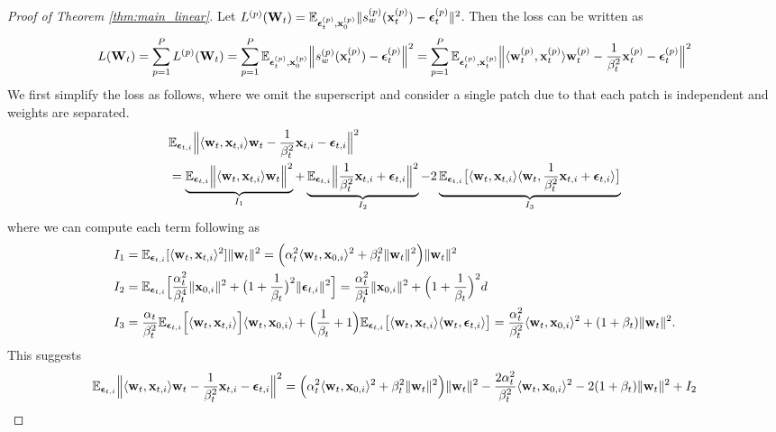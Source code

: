 \begin{proof}[Proof of Theorem \ref{thm:main_linear}]
Let $L^{(p)} ({\mathbf{W}}_t) = {\mathbb{E}}_{{\boldsymbol{\epsilon}}_{t}^{(p)}, {\mathbf{x}}_{0}^{(p)}} \|  s_w^{(p)}({\mathbf{x}}_t^{(p)}) - {\boldsymbol{\epsilon}}_{t}^{(p)} \|^2$. Then the loss can be written as
\begin{align*}
    L({\mathbf{W}}_t) = \sum_{p=1}^P L^{(p)} ({\mathbf{W}}_t) =  \sum_{p=1}^P {\mathbb{E}}_{{\boldsymbol{\epsilon}}_{t}^{(p)}, {\mathbf{x}}_{0}^{(p)}} \Big\|  s_w^{(p)}({\mathbf{x}}_t^{(p)}) - {\boldsymbol{\epsilon}}_{t}^{(p)} \Big\|^2 = \sum_{p=1}^P  {\mathbb{E}}_{{\boldsymbol{\epsilon}}_{t}^{(p)}, {\mathbf{x}}_t^{(p)}}  \Big\|  \langle {\mathbf w}_t^{(p)}, {\mathbf{x}}_{t}^{(p)} \rangle   {\mathbf w}_t^{(p)} - \frac{1}{\beta_t^2} {\mathbf{x}}_{t}^{(p)} - {\boldsymbol{\epsilon}}_{t}^{(p)} \Big\|^2
\end{align*}
We first simplify the loss as follows, where we omit the superscript and consider a single patch due to that each patch is independent and weights are separated.
\begin{align*}
    &{\mathbb{E}}_{{\boldsymbol{\epsilon}}_{t,i}} \Big\| \langle {\mathbf w}_t, {\mathbf{x}}_{t,i} \rangle {\mathbf w}_t - \frac{1}{\beta_t^2} {\mathbf{x}}_{t,i} - {\boldsymbol{\epsilon}}_{t,i}  \Big\|^2 \\
    &= \underbrace{{\mathbb{E}}_{{\boldsymbol{\epsilon}}_{t,i}} \Big\|  \langle {\mathbf w}_t, {\mathbf{x}}_{t,i} \rangle {\mathbf w}_t  \Big\|^2}_{I_1} + \underbrace{{\mathbb{E}}_{{\boldsymbol{\epsilon}}_{t,i}} \Big\|  \frac{1}{\beta_t^2} {\mathbf{x}}_{t,i} + {\boldsymbol{\epsilon}}_{t,i} \Big\|^2}_{I_2} - 2 \underbrace{{\mathbb{E}}_{{\boldsymbol{\epsilon}}_{t,i}} \big[ \langle {\mathbf w}_t  , {\mathbf{x}}_{t,i} \rangle \langle {\mathbf w}_t, \frac{1}{\beta_t^2 }{\mathbf{x}}_{t,i} + {\boldsymbol{\epsilon}}_{t,i} \rangle \big]}_{I_3}
\end{align*}
where we can compute each term following \citep{han2024feature} as  
\begin{align*}
    &I_1 = {\mathbb{E}}_{{\boldsymbol{\epsilon}}_{t,i}} [ \langle {\mathbf w}_t, {\mathbf{x}}_{t,i} \rangle^2 ] \| {\mathbf w}_t \|^2 = \Big( \alpha_t^2 \langle {\mathbf w}_t, {\mathbf{x}}_{0,i} \rangle^2 + \beta_t^2 \| {\mathbf w}_t \|^2 \Big) \| {\mathbf w}_t \|^2 \\
    &I_2 = {\mathbb{E}}_{{\boldsymbol{\epsilon}}_{t,i}} \Big[  \frac{\alpha_t^2}{\beta_t^4} \| {\mathbf{x}}_{0,i}  \|^2 + \big( 1 + \frac{1}{\beta_t}\big)^2 \| {\boldsymbol{\epsilon}}_{t,i} \|^2  \Big] =  \frac{\alpha_t^2}{\beta_t^4 } \| {\mathbf{x}}_{0,i}\|^2 + \Big( 1 + \frac{1}{\beta_t} \Big)^2 d \\
    &I_3  = \frac{\alpha_t}{\beta_t^2} {\mathbb{E}}_{{\boldsymbol{\epsilon}}_{t,i}} \Big[ \langle {\mathbf w}_t, {\mathbf{x}}_{t,i} \rangle \Big] \langle {\mathbf w}_t, {\mathbf{x}}_{0,i} \rangle + \Big( \frac{1}{\beta_t} +1 \Big) {\mathbb{E}}_{{\boldsymbol{\epsilon}}_{t,i}} \big[ \langle {\mathbf w}_t, {\mathbf{x}}_{t,i} \rangle \langle {\mathbf w}_t, {\boldsymbol{\epsilon}}_{t,i} \rangle \big]  = \frac{\alpha_t^2}{\beta_t^2}  \langle {\mathbf w}_t, {\mathbf{x}}_{0,i} \rangle^2 + (1 + \beta_t) \| {\mathbf w}_t \|^2.
\end{align*}
This suggests  
\begin{align*}
    \sE_{\beps_{t,i}} \Big\| \langle \bw_t, \bx_{t,i} \rangle \bw_t - \frac{1}{\beta_t^2} \bx_{t,i} - \beps_{t,i}  \Big\|^2 = \Big( \alpha_t^2 \langle \bw_t, \bx_{0,i} \rangle^2 + \beta_t^2 \| \bw_t \|^2 \Big) \| \bw_t \|^2 - \frac{2\alpha_t^2}{\beta_t^2}  \langle \bw_t, \bx_{0,i} \rangle^2 - 2(1 + \beta_t) \| \bw_t \|^2 + I_2

\end{align*}
\end{proof}
